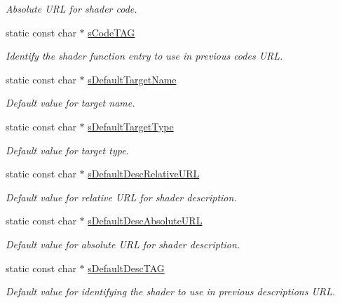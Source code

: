 \begin{DoxyCompactItemize}
\begin{DoxyCompactList}\small\item\em Absolute U\+RL for shader code. \end{DoxyCompactList}\item 
static const char $\ast$ \hyperlink{class_fbx_binding_table_a6d02ecf239125a11d11401c0cb1298b1}{s\+Code\+T\+AG}
\begin{DoxyCompactList}\small\item\em Identify the shader function entry to use in previous code\textquotesingle{}s U\+RL. \end{DoxyCompactList}\item 
static const char $\ast$ \hyperlink{class_fbx_binding_table_a455a2c80eb702925e9e993c79eb548fb}{s\+Default\+Target\+Name}
\begin{DoxyCompactList}\small\item\em Default value for target name. \end{DoxyCompactList}\item 
static const char $\ast$ \hyperlink{class_fbx_binding_table_ae931422dbe542966897e005ec5414984}{s\+Default\+Target\+Type}
\begin{DoxyCompactList}\small\item\em Default value for target type. \end{DoxyCompactList}\item 
static const char $\ast$ \hyperlink{class_fbx_binding_table_a16af5130e73310288bb68e4cef76e7a2}{s\+Default\+Desc\+Relative\+U\+RL}
\begin{DoxyCompactList}\small\item\em Default value for relative U\+RL for shader description. \end{DoxyCompactList}\item 
static const char $\ast$ \hyperlink{class_fbx_binding_table_a98fa2e06e352d7bd0f53a95d297b6963}{s\+Default\+Desc\+Absolute\+U\+RL}
\begin{DoxyCompactList}\small\item\em Default value for absolute U\+RL for shader description. \end{DoxyCompactList}\item 
static const char $\ast$ \hyperlink{class_fbx_binding_table_aec5add4fb938c15ee77ee75a55676ced}{s\+Default\+Desc\+T\+AG}
\begin{DoxyCompactList}\small\item\em Default value for identifying the shader to use in previous description\textquotesingle{}s U\+RL. \end{DoxyCompactList}\item 

\end{DoxyCompactItemize}

